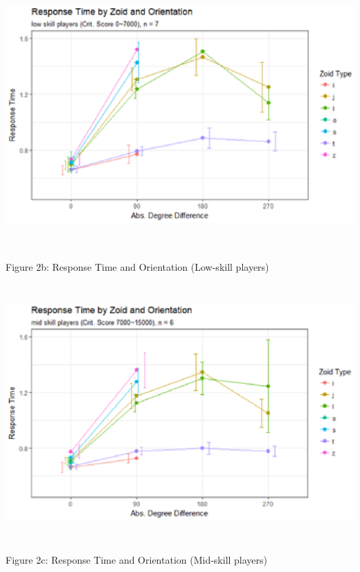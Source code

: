 \documentclass{article}
\begin{document}
	\noindent \includegraphics*[width=6.49in, height=4.00in, keepaspectratio=false]{image16}
	
	\noindent Figure 2b: Response Time and Orientation (Low-skill players)
	
	\noindent \includegraphics*[width=6.27in, height=3.87in, keepaspectratio=false]{image17}
	
	\noindent Figure 2c: Response Time and Orientation (Mid-skill players)
	
\end{document}
